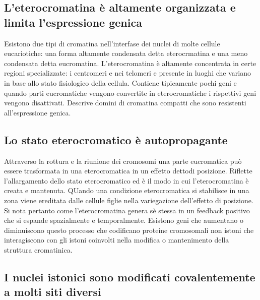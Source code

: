 \subsection{L'eterocromatina \`e altamente organizzata e limita l'espressione genica}
Esistono due tipi di cromatina nell'interfase dei nuclei di molte cellule eucariotiche: una forma altamente condensata detta eterocrmatina e una meno condensata detta eucromatina. 
L'eterocromatina \`e altamente concentrata in certe regioni specializzate: i centromeri e nei telomeri e presente in luoghi che variano in base allo stato fisiologico della cellula. 
Contiene tipicamente pochi geni e quando parti eucromatiche vengono convertite in eterocromatiche i rispettivi geni vengono disattivati. Descrive domini di cromatina compatti che sono
resistenti all'espressione genica.
\subsection{Lo stato eterocromatico \`e autopropagante}
Attraverso la rottura e la riunione dei cromosomi una parte eucromatica pu\`o essere trasformata in una eterocromatica in un effetto dettodi posizione. Riflette l'allargamento dello 
stato eterocromatico ed \`e il modo in cui l'eterocromatina \`e creata e mantenuta. QUando una condizione eterocromatica si stabilisce in una zona viene ereditata dalle cellule figlie
nella variegazione dell'effetto di posizione. Si nota pertanto come l'eterocromatina genera s\`e stessa in un feedback positivo che si espande spazialmente e temporalmente. Esistono 
geni che aumentano o diminuiscono questo processo che codificano proteine cromosomali non istoni che interagiscono con gli istoni coinvolti nella modifica o mantenimento della struttura
cromatinica.
\subsection{I nuclei istonici sono modificati covalentemente a molti siti diversi}

